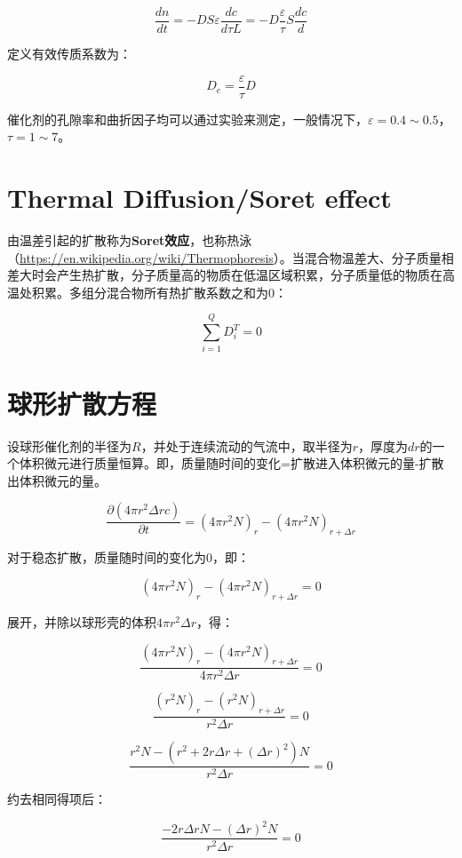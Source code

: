 \[ \frac{dn}{dt} = -DS\varepsilon\frac{dc}{d\tau L} = -D\frac{\varepsilon}{\tau}S\frac{dc}{d} \]

定义有效传质系数为：

\begin{equation}
D_e = \frac{\varepsilon}{\tau}D
\end{equation}

催化剂的孔隙率和曲折因子均可以通过实验来测定，一般情况下，$ \varepsilon=0.4\sim0.5 $，$ \tau=1\sim7 $。

\section{Thermal Diffusion/Soret effect}

由温差引起的扩散称为\textbf{Soret效应}，也称热泳（\url{https://en.wikipedia.org/wiki/Thermophoresis}）。当混合物温差大、分子质量相差大时会产生热扩散，分子质量高的物质在低温区域积累，分子质量低的物质在高温处积累。多组分混合物所有热扩散系数之和为0：

\begin{equation}
\sum_{i=1}^Q D_i^T = 0
\end{equation}

\section{球形扩散方程}

设球形催化剂的半径为$ R $，并处于连续流动的气流中，取半径为$ r $，厚度为$ dr $的一个体积微元进行质量恒算。即，质量随时间的变化=扩散进入体积微元的量-扩散出体积微元的量。

\[ \frac{\partial \left(4\pi r^2\Delta r c\right)}{\partial t} = \left( 4\pi r^2 N \right)_r - \left( 4\pi r^2 N \right)_{r+\Delta r} \]

对于稳态扩散，质量随时间的变化为0，即：

\[ \left( 4\pi r^2 N \right)_r - \left( 4\pi r^2 N \right)_{r+\Delta r} = 0 \]

展开，并除以球形壳的体积$ 4\pi r^2 \Delta r $，得：

\[ \frac{\left( 4\pi r^2 N \right)_r - \left( 4\pi r^2 N \right)_{r+\Delta r}}{4\pi r^2 \Delta r} = 0 \]

\[ \frac{(r^2 N)_r - \left(r^2 N\right)_{r+\Delta r}}{r^2\Delta r} = 0 \]

\[ \frac{r^2 N - (r^2+2r\Delta r + (\Delta r)^2)N}{r^2\Delta r} = 0 \]

约去相同得项后：

\[ \frac{-2r\Delta r N - (\Delta r)^2 N}{r^2\Delta r} = 0 \]

